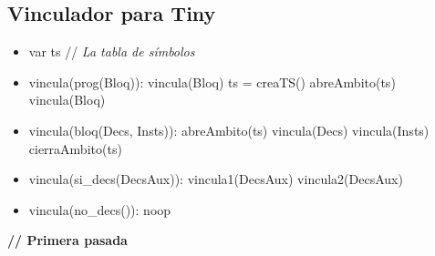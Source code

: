 \documentclass[11pt]{article}
\begin{document}
        \subsection{Vinculador para Tiny}
            \begin{itemize}
                \item var ts \/// \textit{La tabla de símbolos}
                \item vincula(prog(Bloq)):
                    \subitem vincula(Bloq)
                    \subitem ts = creaTS()
                    \subitem abreAmbito(ts)
                    \subitem vincula(Bloq)       
                \item vincula(bloq(Decs, Insts)):
                    \subitem abreAmbito(ts)
                    \subitem vincula(Decs)
                    \subitem vincula(Insts)
                    \subitem cierraAmbito(ts)
                \item vincula(si\_decs(DecsAux)):
                    \subitem vincula1(DecsAux)
                    \subitem vincula2(DecsAux)
                \item vincula(no\_decs()):
                    \subitem noop
            \end{itemize}
            \textbf{\/// Primera pasada}
\end{document}
